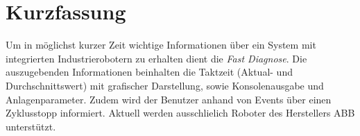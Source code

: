 \chapter*{Kurzfassung}
\thispagestyle{empty}
Um in möglichst kurzer Zeit wichtige Informationen über ein System mit 
integrierten Industrierobotern zu erhalten dient die  \textit{Fast 
Diagnose}. Die auszugebenden Informationen beinhalten die Taktzeit (Aktual- und 
Durchschnittswert) mit grafischer Darstellung, sowie Konsolenausgabe und 
Anlagenparameter. Zudem wird der Benutzer anhand von Events über einen 
Zyklusstopp informiert. Aktuell werden ausschlielich Roboter des Herstellers 
ABB unterstützt.